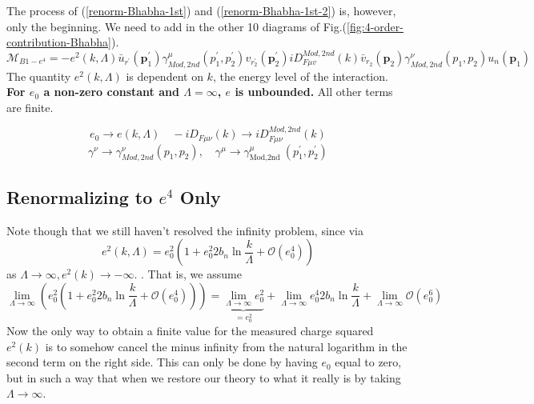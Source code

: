 The process of (\ref{renorm-Bhabha-1st}) and (\ref{renorm-Bhabha-1st-2}) is, however, only the beginning. We need to add in the other 10 diagrams of Fig.(\ref{fig:4-order-contribution-Bhabha}).
\begin{equation}
\mathcal{M}_{B1-e^4}=-e^2(k,\Lambda)\bar{u}_{r^{\prime}}\left(\mathbf{p}_{1}^{\prime}\right) \gamma_{Mod,2nd}^{\mu}\left(p_{1}^{\prime}, p_{2}^{\prime}\right) v_{r_{2}^{\prime}}\left(\mathbf{p}_{2}^{\prime}\right) i D_{F \mu v}^{Mod,2 n d}(k) \bar{v}_{r_{2}}\left(\mathbf{p}_{2}\right) \gamma_{Mod,2 nd}^{\nu}\left(p_{1}, p_{2}\right) u_{n}\left(\mathbf{p}_{1}\right)
\end{equation}
The quantity $e^2(k,\Lambda)$ is dependent on $k$, the energy level of the interaction. \textbf{For $e_0$ a non-zero constant and $\Lambda=\infty$, $e$ is unbounded.} All other terms are finite. 
\begin{qt}
    $$
    e_0\rightarrow e(k,\Lambda)\quad
    -i D_{F \mu \nu}(k) \rightarrow i D_{F \mu \nu}^{Mod,2 n d}(k)$$
    $$\gamma^{\nu} \rightarrow \gamma_{Mod,2nd}^{\nu}\left(p_{1}, p_{2}\right), \quad\gamma^{\mu} \rightarrow \gamma_{\text {Mod,2nd }}^{\mu}\left(p_{1}^{\prime}, p_{2}^{\prime}\right)$$
\end{qt}
\subsection{Renormalizing to \texorpdfstring{$e^4$}{TEXT} Only}
Note though that we still haven't resolved the infinity problem, since via
\begin{equation}e^{2}(k, \Lambda)=e_{0}^{2}\left(1+e_{0}^{2} 2 b_{n} \ln \frac{k}{\Lambda}+\mathcal{O}\left(e_{0}^{4}\right)\right)\end{equation}
as $\Lambda\rightarrow\infty, e^{2}(k) \rightarrow-\infty$. . That is, we assume
\begin{equation}
    \lim_{\Lambda \to \infty}\left(e_{0}^{2}\left(1+e_{0}^{2} 2 b_{n} \ln \frac{k}{\Lambda}+\mathcal{O}\left(e_{0}^{4}\right)\right)\right)=\underbrace{\lim_{\Lambda\rightarrow\infty} e_{0}^{2}}_{=e^2_0}+\lim_{\Lambda \rightarrow \infty} e_{0}^{4} 2 b_{n} \ln \frac{k}{\Lambda}+\lim_{\Lambda \rightarrow \infty}\mathcal{O}(e_{0}^{6})
\end{equation}
Now the only way to obtain a finite value for the measured charge squared $e^{2}(k)$ is to somehow cancel the minus infinity from the natural logarithm in the second term on the right side. This can only be done by having $e_{0}$ equal to zero, but in such a way that when we restore our theory to what it really is by taking $\Lambda\to\infty$.

